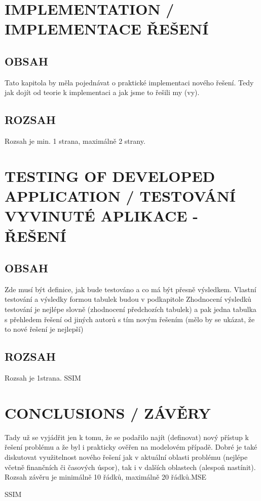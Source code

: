 \documentclass[journal]{IEEEtran}
\begin{document}
\section{IMPLEMENTATION / IMPLEMENTACE ŘEŠENÍ}
\subsection{OBSAH}
Tato kapitola by měla pojednávat o praktické implementaci nového řešení. Tedy jak dojít od teorie k implementaci a jak jsme to řešili my (vy).
\subsection{ROZSAH}
Rozsah je min. 1 strana, maximálně 2 strany.





\section{TESTING OF DEVELOPED APPLICATION / TESTOVÁNÍ VYVINUTÉ APLIKACE - ŘEŠENÍ}
\subsection{OBSAH}
Zde musí být definice, jak bude testováno a co má být přesně výsledkem.
Vlastní testování a výsledky formou tabulek budou v podkapitole
Zhodnocení výsledků testování je nejlépe slovně (zhodnocení předchozích tabulek) a pak jedna tabulka s přehledem řešení od jiných autorů s tím novým řešením (mělo by se ukázat, že to nové řešení je nejlepší)
\subsection{ROZSAH}
Rozsah je 1strana. \ac{SSIM}



\section{CONCLUSIONS / ZÁVĚRY}
Tady už se vyjádřit jen k tomu, že se podařilo najít (definovat) nový přístup k řešení problému a že byl i prakticky ověřen na modelovém případě. 
Dobré je také diskutovat využitelnost nového řešení jak v aktuální oblasti problému (nejlépe včetně finančních či časových úspor), tak i v dalších oblastech (alespoň nastínit).
Rozsah závěru je minimálně 10 řádků, maximálně 20 řádků.\ac{MSE}\cite{einstein}

\ac{SSIM}


\printbibliography

\printacronyms


\end{document}
